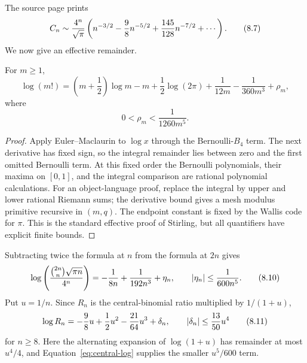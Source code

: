 The source page prints
\[
 C_n\sim\frac{4^n}{\sqrt\pi}
 \left(n^{-3/2}-\frac98n^{-5/2}+\frac{145}{128}n^{-7/2}+\cdots\right).
\tag{8.7}\label{eq:printed-expansion}
\]
We now give an effective remainder.

\begin{lemma}
For $m\ge1$,
\[
 \log(m!)=
 \left(m+\frac12\right)\log m-m+\frac12\log(2\pi)
 +\frac1{12m}-\frac1{360m^3}+\rho_m,                            \tag{8.8}
\]
where
\[
 0<\rho_m<\frac1{1260m^5}.                                      \tag{8.9}
\]
\end{lemma}

\begin{proof}
Apply Euler--Maclaurin to $\log x$ through the Bernoulli-$B_4$ term.  The next
derivative has fixed sign, so the integral remainder lies between zero and
the first omitted Bernoulli term.  At this fixed order the Bernoulli
polynomials, their maxima on $[0,1]$, and the integral comparison are rational
polynomial calculations.  For an object-language proof, replace the integral
by upper and lower rational Riemann sums; the derivative bound gives a mesh
modulus primitive recursive in $(m,q)$.  The endpoint constant is fixed by the
Wallis code for $\pi$.  This is the standard effective proof of Stirling, but
all quantifiers have explicit finite bounds.
\end{proof}

Subtracting twice the formula at $n$ from the formula at $2n$ gives
\[
 \log\left(\frac{\binom{2n}{n}\sqrt{\pi n}}{4^n}\right)
 =-\frac1{8n}+\frac1{192n^3}+\eta_n,
 \qquad \left|\eta_n\right|\le\frac1{600n^5}.                          \tag{8.10}\label{eq:central-log}
\]
Put $u=1/n$.  Since $R_n$ is the central-binomial ratio multiplied by
$1/(1+u)$,
\[
 \log R_n=-\frac98u+\frac12u^2-\frac{21}{64}u^3+\delta_n,
 \qquad \left|\delta_n\right|\le\frac{13}{50}u^4                     \tag{8.11}\label{eq:Rlog}
\]
for $n\ge8$.  Here the alternating expansion of $\log(1+u)$ has remainder at
most $u^4/4$, and Equation~\eqref{eq:central-log} supplies the smaller
$u^5/600$ term.


